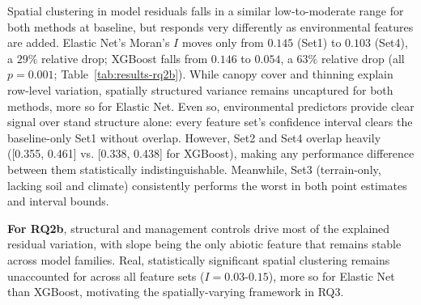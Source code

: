 Spatial clustering in model residuals falls in a similar low-to-moderate range for both methods at baseline, but responds very differently as environmental features are added. Elastic Net's Moran's $I$ moves only from $0.145$ (Set1) to $0.103$ (Set4), a $29\%$ relative drop; XGBoost falls from $0.146$ to $0.054$, a $63\%$ relative drop (all $p=0.001$; Table~\ref{tab:results-rq2b}).   While canopy cover and thinning explain row-level variation, spatially structured variance remains uncaptured for both methods, more so for Elastic Net. Even so, environmental predictors provide clear signal over stand structure alone: every feature set's confidence interval clears the baseline-only Set1 without overlap. However, Set2 and Set4 overlap heavily ([0.355, 0.461] vs. [0.338, 0.438] for XGBoost), making any performance difference between them statistically indistinguishable. Meanwhile, Set3 (terrain-only, lacking soil and climate) consistently performs the worst in both point estimates and interval bounds.

\textbf{For RQ2b}, structural and management controls drive most of the explained residual variation, with slope being the only abiotic feature that remains stable across model families. Real, statistically significant spatial clustering remains unaccounted for across all feature sets ($I=0.03$-$0.15$), more so for Elastic Net than XGBoost, motivating the spatially-varying framework in RQ3.



